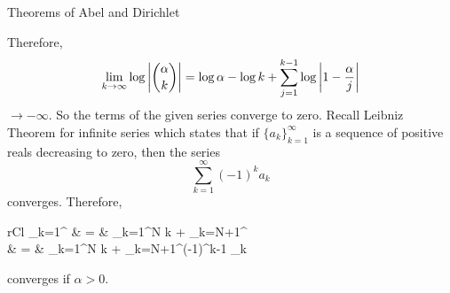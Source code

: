 \begin{section}{Theorems of Abel and Dirichlet}
\begin{soln}
\begin{enumerate}[i)]
\begin{enumerate}[{Case} 1.]
\begin{displaymath}
							\end{displaymath}
						Therefore,
							\begin{displaymath}
								\lim_{k \rightarrow \infty}
									\log \left \vert {{\alpha \choose k}} \right \vert =
									\log \alpha - \log k +
									\sum_{j=1}^{k-1} \log \left \vert {
									1-\frac{\alpha}{j}} \right \vert
							\end{displaymath}
						$\rightarrow -\infty$. So the terms of the given series
						converge to zero. Recall Leibniz Theorem for infinite series
						which states that if $\{a_k\}_{k=1}^\infty$ is a sequence of
						positive reals decreasing to zero, then the series
							\begin{displaymath}
								\sum_{k=1}^\infty (-1)^k a_k
							\end{displaymath}
						converges. Therefore,
							\begin{IEEEeqnarray*}{rCl}
								\sum_{k=1}^ & = &
									\sum_{k=1}^N {\alpha \choose k}
									+ \sum_{k=N+1}^\infty {\alpha \choose k} \\
								& = & \sum_{k=1}^N {\alpha \choose k}
									+ \beta \sum_{k=N+1}^\infty (-1)^{k-1} \beta_k
							\end{IEEEeqnarray*}
						converges if $\alpha > 0$.
						

\end{enumerate}
\end{enumerate}
\end{soln}
\end{section}
